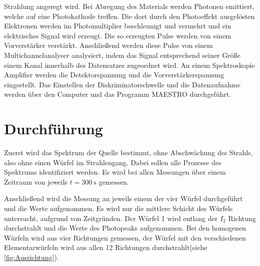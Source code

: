 Strahlung angeregt wird. Bei Abregung des Materials werden Photonen emittiert, welche auf eine Photokathode treffen. Die dort durch den Photoeffekt
ausgelösten Elektronen werden im Photomultiplier beschleunigt und vermehrt und ein elektrisches Signal wird erzeugt.
Die so erzeugten Pulse werden von einem Vorverstärker verstärkt.
Anschließend werden diese Pulse von einem Multichannelanalyser analysiert, indem das Signal entsprechend seiner Größe einem Kanal innerhalb des Datensatzes zugeordnet wird.
An einem Spektroskopie Amplifier werden die Detektorspannung und die Vorverstärkerspannung eingestellt. Das Einstellen der Diskriminatorschwelle und die Datenaufnahme
werden über den Computer und das Programm MAESTRO durchgeführt.



\section{Durchführung}
\label{sec:Durchführung}
Zuerst wird das Spektrum der Quelle bestimmt, ohne Abschwächung des Strahls, also ohne einen Würfel im Strahlengang.
Dabei sollen alle Prozesse des Spektrums identifiziert werden.
Es wird bei allen Messungen über einem Zeitraum von jeweils $t = \qty{300}{\second}$ gemessen.

Anschließend wird die Messung an jeweils einem der vier Würfel durchgeführt und die Werte aufgenommen.
Es wird nur die mittlere Schicht des Würfels untersucht, aufgrund von Zeitgründen.
Der Würfel 1 wird entlang der $I_2$ Richtung durchstrahlt und die Werte des Photopeaks aufgenommen.
Bei den homogenen Würfeln wird aus vier Richtungen gemessen, der Würfel mit den verschiedenen 
Elementarwürfeln wird aus allen 12 Richtungen durchstrahlt(siehe \autoref{fig:Ausrichtung}).

